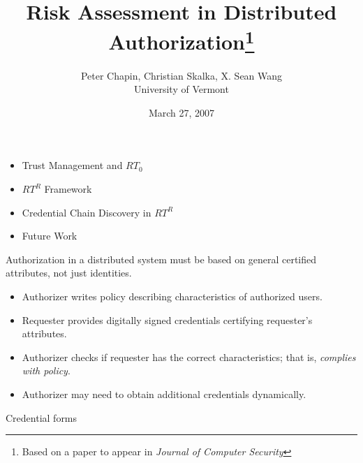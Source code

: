 \documentclass[landscape]{slides}
\begin{document}
\title{Risk Assessment in Distributed Authorization\footnote{Based on a paper to appear in \textit{Journal of Computer Security}}}
\author{Peter Chapin, Christian Skalka, X. Sean Wang\\University of Vermont}
\date{March 27, 2007}
\maketitle




\begin{itemize}

\item Trust Management and $RT_0$
\item $RT^R$ Framework
\item Credential Chain Discovery in $RT^R$
\item Future Work

\end{itemize}

\stopslide


Authorization in a distributed system must be based on general certified attributes, not just identities.
\begin{itemize}
\item Authorizer writes policy describing characteristics of authorized users.
\item Requester provides digitally signed credentials certifying requester's attributes.
\item Authorizer checks if requester has the correct characteristics; that is, \textit{complies with policy}.
\item Authorizer may need to obtain additional credentials dynamically.
\end{itemize}
\stopslide


Credential forms
\begin{mathpar}



\end{mathpar}
\end{document}
